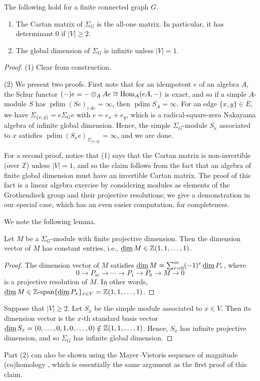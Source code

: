 \documentclass[a4paper,leqno]{amsart}
\begin{document}
\begin{prop}\label{prop:cartan gldim}
The following hold for a finite connected graph $G$.
\begin{enumerate}
    \item The Cartan matrix of $\Sigma_G$ is the all-one matrix.  In particular, it has determinant $0$ if $|V|\ge 2$.
    
    \item The global dimension of $\Sigma_G$ is infinite unless $|V|=1$.
\end{enumerate}
\end{prop}
\begin{proof}
 (1)  Clear from construction.

 (2) We present two proofs.  First note that for an idempotent $e$ of an algebra $A$, the Schur functor $(-)e=-\otimes_AAe\cong \operatorname{Hom}_A(eA,-)$ is exact, and so if a simple $A$-module $S$ has $\operatorname{pdim}(Se)_{eAe}=\infty$, then $\operatorname{pdim}S_{A}=\infty$.  For an edge $\{x,y\}\in E$, we have $\Sigma_{\{x,y\}} = e\Sigma_Ge$ with $e=e_x+e_y$, which is a radical-square-zero Nakayama algebra of infinite global dimension.  Hence, the simple $\Sigma_G$-module $S_x$ associated to $x$ satisfies $\operatorname{pdim}(S_xe)_{\Sigma_{\{x,y\}}}=\infty$, and we are done.

 For a second proof, notice that (1) says that the Cartan matrix is non-invertible (over $\mathbb{Z}$) unless $|V|=1$, and so the claim follows from the fact that an algebra of finite global dimension must have an invertible Cartan matrix. The proof of this fact is a linear algebra exercise by considering  modules as elements of the Grothendieck group and their projective resolutions; we give a demonstration in our special case, which has an even easier computation, for completeness.

We note the following lemma.
\begin{lem}\label{lem:fin pdim module dimvec}
Let $M$ be a $\Sigma_G$-module with finite projective dimension. 
Then the dimension vector of $M$ has constant entries, i.e., $\operatorname{\underline{dim}} M\in \mathbb{Z}(1,1,\ldots,1)$.
\end{lem}
\begin{proof}
The dimension vector of $M$ satisfies $\operatorname{\underline{dim}} M = \sum_{r=0}^m(-1)^r \operatorname{\underline{dim}} P_r$, where
$$0\to P_m\to \cdots \to P_1\to P_0\to M\to 0$$
is a projective resolution of $M$.  In other words, $\operatorname{\underline{dim}} M \in \mathbb{Z}\text{-span} \{\operatorname{\underline{dim}} P_x\}_{x\in V} = \mathbb{Z}(1,1,\ldots, 1)$.    
\end{proof}

Suppose that $|V|\geq 2$.
Let $S_x$ be the simple module associated to $x\in V$.  Then its dimension vector is the $x$-th standard basis vector $\operatorname{\underline{dim}} S_x=(0,\dots,0,1,0,\dots,0)\notin \mathbb Z(1,1,\dots,1)$.  Hence, $S_x$ has infinite projective dimension, and so $\Sigma_G$ has infinite global dimension.
\end{proof}
\begin{rmk}\label{rmk:mayer-vietoris}
    Part (2) can also be shown using the Mayer--Vietoris sequence of magnitude (co)homology \cite{BK21}, which is essentially the same argument as the first proof of this claim.
\end{rmk}
\end{document}
